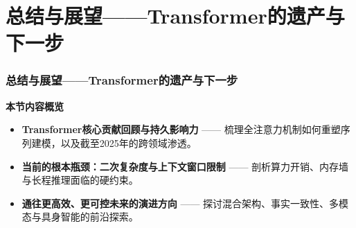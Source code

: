\documentclass[11pt]{beamer}
\begin{document}
\section{总结与展望——Transformer的遗产与下一步}
\begin{frame}
\frametitle{总结与展望——Transformer的遗产与下一步}
\textbf{本节内容概览}

\bigskip

\begin{itemize}
  \item \textbf{Transformer核心贡献回顾与持久影响力} —— 梳理全注意力机制如何重塑序列建模，以及截至2025年的跨领域渗透。
  \item \textbf{当前的根本瓶颈：二次复杂度与上下文窗口限制} —— 剖析算力开销、内存墙与长程推理面临的硬约束。
  \item \textbf{通往更高效、更可控未来的演进方向} —— 探讨混合架构、事实一致性、多模态与具身智能的前沿探索。
\end{itemize}
\end{frame}
\end{document}
